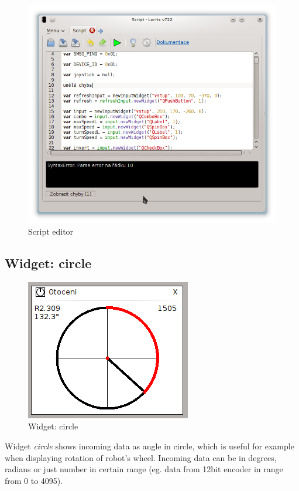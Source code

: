 \documentclass[12pt, a4paper, oneside]{article}
\newcommand{\It}{\textit}  %
\begin{document}
\begin{figure}[h]
\begin{center}
\includegraphics[width=\textwidth]{img/w_script_src.png}
\caption{Script editor}
\label{script_src}
\end{center}
\end{figure}

\subsection{Widget: circle}
\begin{figure}[H]
\begin{center}
\includegraphics[scale=0.8]{img/w_circle.png}
\caption{Widget: circle}
\end{center}
\end{figure}
Widget \It{circle} shows incoming data as angle in circle, which is useful for example when displaying rotation of robot's wheel. Incoming data can be in degrees, radians or just number in certain range (eg. data from 12bit encoder in range from 0 to 4095).
\end{document}
